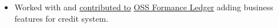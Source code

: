 \begin{itemize}
    \item Worked with and \href{https://github.com/formancehq/ledger/commit/08f8e2aecc051fceea05d2e5b704436baf4f5005}{contributed to} \href{https://github.com/formancehq/ledger}{OSS Formance Ledger} adding business features for credit system.
\end{itemize}
